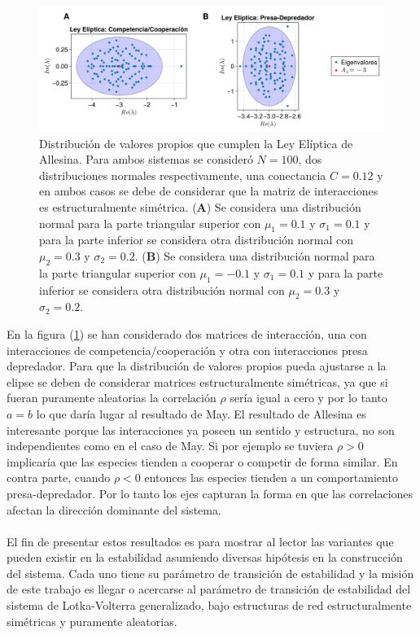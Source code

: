 \begin{figure}[h!]
	\centering
	\includegraphics[scale=0.2]{../Imagenes/LeyElipticaAllesina}
	\caption{Distribución de valores propios que cumplen la Ley Elíptica de Allesina. Para ambos sistemas se consideró $N=100$, dos distribuciones normales respectivamente, una conectancia $C=0.12$ y en ambos casos se debe de considerar que la matriz de interacciones es estructuralmente simétrica. (\textbf{A}) Se considera una distribución normal para la parte triangular superior con $\mu_1=0.1$ y $\sigma_1 = 0.1$ y para la parte inferior se considera otra distribución normal con $\mu_2=0.3$ y $\sigma_2 = 0.2$. (\textbf{B}) Se considera una distribución normal para la parte triangular superior con $\mu_1=-0.1$ y $\sigma_1=0.1$ y para la parte inferior se considera otra distribución normal con $\mu_2=0.3$ y $\sigma_2=0.2$. }
	\label{fig:LeyElipticaAllesina}
\end{figure}

En la figura (\ref{fig:LeyElipticaAllesina}) se han considerado dos matrices de interacción, una con interacciones de competencia/cooperación y otra con interacciones presa depredador. Para que la distribución de valores propios pueda ajustarse a la elipse se deben de considerar matrices estructuralmente simétricas, ya que si fueran puramente aleatorias la correlación $\rho$ sería igual a cero y por lo tanto $a=b$ lo que daría lugar al resultado de May. El resultado de Allesina es interesante porque las interacciones ya poseen un sentido y estructura, no son independientes como en el caso de May. Si por ejemplo se tuviera $\rho>0$ implicaría que las especies tienden a cooperar o competir de forma similar. En contra parte, cuando $\rho <0$ entonces las especies tienden a un comportamiento presa-depredador. Por lo tanto los ejes capturan la forma en que las correlaciones afectan la dirección dominante del sistema. \\
\\
El fin de presentar estos resultados es para mostrar al lector las variantes que pueden existir en la estabilidad asumiendo diversas hipótesis en la construcción del sistema. Cada uno tiene su parámetro de transición de estabilidad y la misión de este trabajo es llegar o acercarse al parámetro de transición de estabilidad del sistema de Lotka-Volterra generalizado, bajo estructuras de red estructuralmente simétricas y puramente aleatorias.

